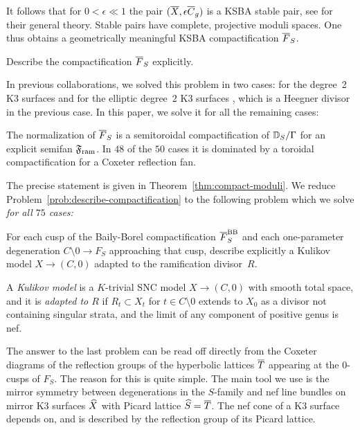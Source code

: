 \documentclass{amsart}
\begin{document}
It follows that for $0<\epsilon\ll1$ the pair $({\overline X}, \epsilon{\overline C}_g)$
is a KSBA stable pair, see \cite{kollar2023families-of-varieties} for
their general theory. Stable pairs have complete, projective moduli
spaces. One thus obtains a geometrically meaningful KSBA
compactification ${\overline F}_S$.

\begin{problem}\label{prob:describe-compactification}
  Describe the compactification ${\overline F}_S$ explicitly.
\end{problem}

In previous collaborations, we solved this problem in two cases:
for the degree~2 K3 surfaces \cite{alexeev2019stable-pair} and for
the elliptic degree~2 K3 surfaces
\cite{alexeev2020compactifications-moduli}, which is a Heegner divisor
in the previous case. In this paper, we solve it for all the remaining
cases:

\begin{theorem}\label{thm:main-compactifications}
  The normalization of ${\overline F}_S$ is a semitoroidal compactification of
  ${\mathbb D}_S/\Gamma$ for an explicit semifan ${\mathfrak F}_{\rm ram}$. 
  In $48$ of the $50$ cases it is dominated by a toroidal
  compactification for a Coxeter reflection fan.
\end{theorem}

The precise statement is given in Theorem~\ref{thm:compact-moduli}. 
We reduce Problem~\ref{prob:describe-compactification} to the
following problem which we solve \emph{for all $75$ cases:}

\begin{problem}\label{prob:kulikov-models}
  For each cusp of the Baily-Borel compactification ${\overline F}_S^{\rm BB}$ 
  and each one-parameter degeneration $C\setminus 0\to F_S$
  approaching that cusp, describe explicitly a Kulikov
  model $X\to (C,0)$ adapted to the ramification divisor~$R$.
\end{problem}

A {\it Kulikov model} is a $K$-trivial SNC model $X\to (C,0)$ with smooth total
space, and it is {\it adapted to $R$} if $R_t\subset X_t$ for $t\in C\setminus 0$ extends to
$X_0$ as a divisor not containing singular strata, and the limit of any component
of positive genus is nef.

The answer to the last problem can be read off
directly from the Coxeter diagrams of the reflection groups of the
hyperbolic lattices ${\overline T}$ appearing at the $0$-cusps of $F_S$. The
reason for this is quite simple. The main tool  we use is the
mirror symmetry between degenerations in the $S$-family and nef line
bundles on mirror K3 surfaces ${\widehat X}$ with Picard lattice
${\widehat S}={\overline T}$. The nef cone of a K3 surface depends on, and is described
by the reflection group of its Picard lattice.
\end{document}

